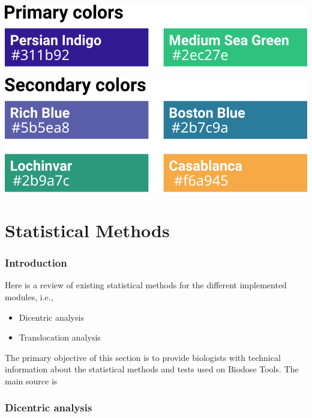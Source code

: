 \documentclass[]{scrartcl}
\providecommand{\tightlist}{%
  \setlength{\itemsep}{0pt}\setlength{\parskip}{0pt}}
\begin{document}
\begin{center}\includegraphics{images/user-manual/color-palette-primary} \end{center}

\begin{center}\includegraphics{images/user-manual/color-palette-secondary} \end{center}

\hypertarget{part-statistical-methods}{%
\part{Statistical Methods}\label{part-statistical-methods}}

\hypertarget{stats-intro}{%
\section{Introduction}\label{stats-intro}}

Here is a review of existing statistical methods for the different implemented modules, i.e.,

\begin{itemize}
\tightlist
\item
  Dicentric analysis
\item
  Translocation analysis
\end{itemize}

The primary objective of this section is to provide biologists with technical information about the statistical methods and tests used on Biodose Tools. The main source is \citep{IAEA2001}

\hypertarget{stats-dicent}{%
\section{Dicentric analysis}\label{stats-dicent}}
\end{document}
